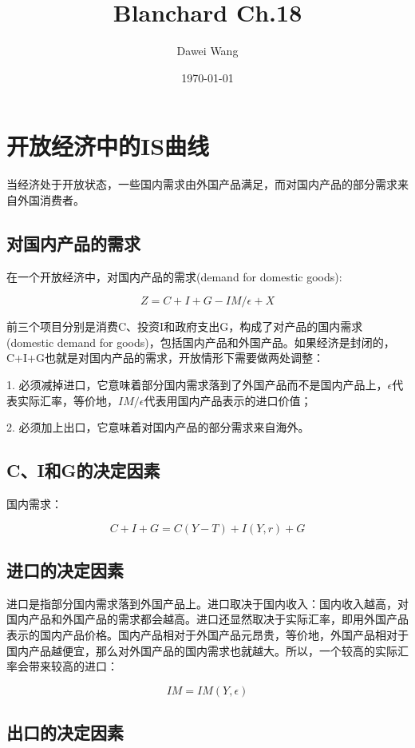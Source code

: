 \documentclass{article}
\title{Blanchard Ch.18}
\author{Dawei Wang}
\date{\today}
\begin{document}
	\maketitle
	
\section{开放经济中的IS曲线}
当经济处于开放状态，一些国内需求由外国产品满足，而对国内产品的部分需求来自外国消费者。

\subsection{对国内产品的需求}

在一个开放经济中，对国内产品的需求(demand for domestic goods):

\[
Z=C+I+G-IM/\epsilon+X
\]

前三个项目分别是消费C、投资I和政府支出G，构成了对产品的国内需求(domestic demand for goods)，包括国内产品和外国产品。如果经济是封闭的，C+I+G也就是对国内产品的需求，开放情形下需要做两处调整：

1. 必须减掉进口，它意味着部分国内需求落到了外国产品而不是国内产品上，$ \epsilon $代表实际汇率，等价地，$ IM/\epsilon $代表用国内产品表示的进口价值；

2. 必须加上出口，它意味着对国内产品的部分需求来自海外。

\subsection{C、I和G的决定因素}

国内需求：

\[
C+I+G=C(Y-T)+I(Y,r)+G
\]

\subsection{进口的决定因素}

进口是指部分国内需求落到外国产品上。进口取决于国内收入：国内收入越高，对国内产品和外国产品的需求都会越高。进口还显然取决于实际汇率，即用外国产品表示的国内产品价格。国内产品相对于外国产品元昂贵，等价地，外国产品相对于国内产品越便宜，那么对外国产品的国内需求也就越大。所以，一个较高的实际汇率会带来较高的进口：

\[
IM=IM(Y,\epsilon)
\]

\subsection{出口的决定因素}
\end{document}
